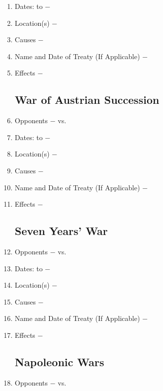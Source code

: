 \documentclass[12pt]{article}
\begin{document}
\begin{enumerate}
\item Dates: to $-$

\item Location(s) $-$ 

\item Causes $-$

\item Name and Date of Treaty (If Applicable) $-$ 

\item Effects $-$ 

\subsection{War of Austrian Succession}

\item Opponents $-$ vs.

\item Dates: to $-$

\item Location(s) $-$ 

\item Causes $-$

\item Name and Date of Treaty (If Applicable) $-$ 

\item Effects $-$ 

\subsection{Seven Years' War}

\item Opponents $-$ vs.

\item Dates: to $-$

\item Location(s) $-$ 

\item Causes $-$

\item Name and Date of Treaty (If Applicable) $-$ 

\item Effects $-$

\subsection{Napoleonic Wars} 

\item Opponents $-$ vs.


\end{enumerate}
\end{document}
